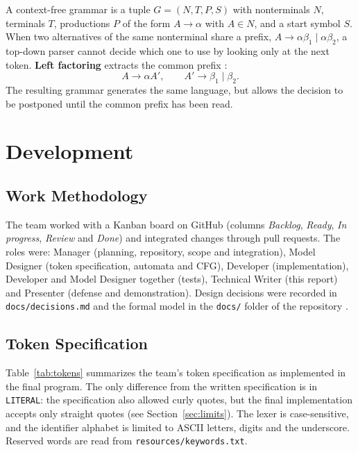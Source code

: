 \documentclass[11pt,letterpaper]{article}
\newcommand{\tok}[1]{\texttt{#1}}
\begin{document}
A context-free grammar is a tuple $G=(N,T,P,S)$ with nonterminals $N$,
terminals $T$, productions $P$ of the form $A\to\alpha$ with $A\in N$, and a
start symbol $S$. When two alternatives of the same nonterminal share a
prefix, $A\to\alpha\beta_1\mid\alpha\beta_2$, a top-down parser cannot decide
which one to use by looking only at the next token. \textbf{Left factoring}
extracts the common prefix \cite{aho2006}:
\[
A\to\alpha A',\qquad A'\to\beta_1\mid\beta_2 .
\]
The resulting grammar generates the same language, but allows the decision to
be postponed until the common prefix has been read.

\section{Development}

\subsection{Work Methodology}

The team worked with a Kanban board on GitHub (columns \emph{Backlog},
\emph{Ready}, \emph{In progress}, \emph{Review} and \emph{Done}) and
integrated changes through pull requests. The roles were: Manager (planning,
repository, scope and integration), Model Designer (token specification,
automata and CFG), Developer (implementation), Developer and Model Designer
together (tests), Technical Writer (this report) and Presenter (defense and
demonstration). Design decisions were recorded in \tok{docs/decisions.md} and
the formal model in the \tok{docs/} folder of the repository
\cite{repo}.

\subsection{Token Specification}

Table~\ref{tab:tokens} summarizes the team's token specification as
implemented in the final program. The only difference from the written
specification is in \tok{LITERAL}: the specification also allowed curly
quotes, but the final implementation accepts only straight quotes (see
Section~\ref{sec:limits}). The lexer is case-sensitive, and the identifier alphabet is limited to ASCII letters,
digits and the underscore. Reserved words are read from
\tok{resources/keywords.txt}.
\end{document}

